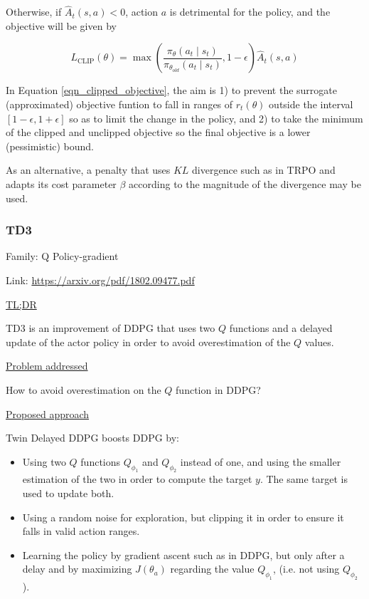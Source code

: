 \documentclass[12pt, english]{article}
\begin{document}
Otherwise, if $\hat{A}_t(s,a) < 0$, action $a$ is detrimental for the policy, and the objective will be given by

\begin{equation*}
  L_{\text{CLIP}} (\theta) = \max (\frac{\pi_\theta(a_t \mid s_t)}{\pi_{\theta_{old}} (a_t \mid s_t)}, 1-\epsilon) \hat{A}_t(s,a)
\end{equation*}

In Equation \ref{eqn_clipped_objective}, the aim is 1) to prevent the surrogate (approximated) objective funtion to fall in ranges of $r_t(\theta)$ outside the interval $[1-\epsilon, 1+\epsilon]$ so as to limit the change in the policy, and 2) to take the minimum of the clipped and unclipped objective so the final objective is a lower (pessimistic) bound.

As an alternative, a penalty that uses $KL$ divergence such as in TRPO and adapts its cost parameter $\beta$ according to the magnitude of the divergence may be used.

\subsubsection{TD3}
\label{TD3}

Family: Q Policy-gradient

Link: \url{https://arxiv.org/pdf/1802.09477.pdf}

\underline{TL;DR}

TD3 \cite{fujimoto_addressing_2018} is an improvement of DDPG that uses two $Q$ functions and a delayed update of the actor policy in order to avoid overestimation of the $Q$ values.

\underline{Problem addressed}

How to avoid overestimation on the $Q$ function in DDPG?

\underline{Proposed approach}

Twin Delayed DDPG boosts DDPG by:

\begin{itemize}
  \item Using two $Q$ functions $Q_{\phi_1}$ and $Q_{\phi_2}$ instead of one, and using the smaller estimation of the two in order to compute the target $y$. The same target is used to update both.
  \item Using a random noise for exploration, but clipping it in order to ensure it falls in valid action ranges.
  \item Learning the policy by gradient ascent such as in DDPG, but only after a delay and by maximizing $J(\theta_a)$ regarding the value $Q_{\phi_1}$, (i.e. not using $Q_{\phi_2}$).
\end{itemize}
\end{document}
